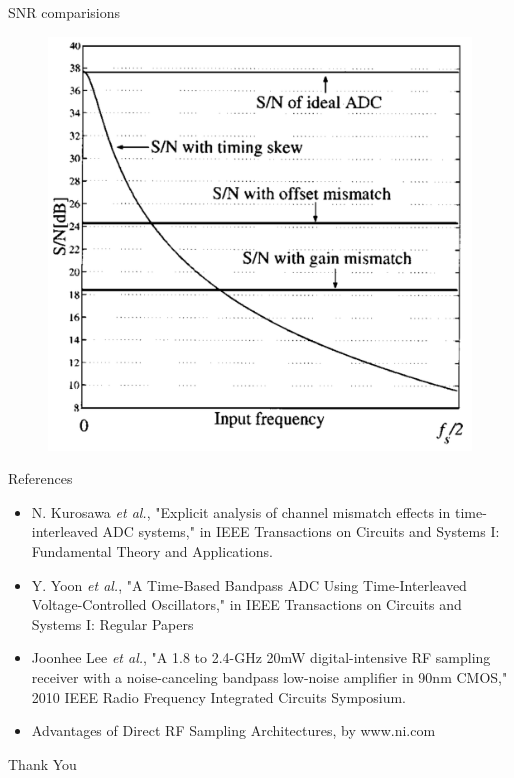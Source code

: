 \documentclass{beamer}
\begin{document}
\begin{frame}{SNR comparisions}
\begin{figure}
	\includegraphics[scale=0.25]{./figs/Over.png}
\end{figure}
\end{frame}

\begin{frame}{References}
\begin{itemize}
	\item N. Kurosawa \textit{et al.}, "Explicit analysis of channel mismatch effects in time-interleaved ADC systems," in IEEE Transactions on Circuits and Systems I: Fundamental Theory and Applications.
	\item Y. Yoon \textit{et al.}, "A Time-Based Bandpass ADC Using Time-Interleaved Voltage-Controlled Oscillators," in IEEE Transactions on Circuits and Systems I: Regular Papers
	\item Joonhee Lee \textit{et al.}, "A 1.8 to 2.4-GHz 20mW digital-intensive RF sampling receiver with a noise-canceling bandpass low-noise amplifier in 90nm CMOS," 2010 IEEE Radio Frequency Integrated Circuits Symposium.
	\item Advantages of Direct RF Sampling Architectures, by www.ni.com
\end{itemize}
\end{frame}
\begin{frame}{}
\centering
 \Huge
 Thank You
\end{frame}
\end{document}
